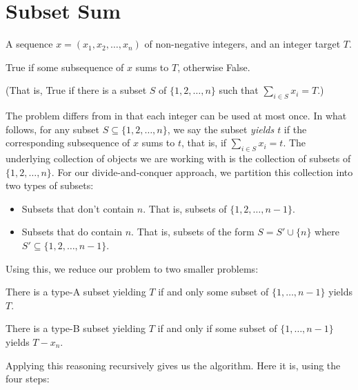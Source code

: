 
\section{Subset Sum}\label{dp: sec: subset sum}

\begin{mylist}
\item[\bf input:] A sequence $x=(x_1, x_2, \ldots, x_n)$ of non-negative integers, and an integer target $T$.
\item[\bf output:] \textsf{True} if some subsequence of $x$ sums to $T$, otherwise \textsf{False}.

  (That is, \textsf{True} if there is a subset $S$ of $\{1,2,\ldots,n\}$ such that $\sum_{i\in S} x_i = T$.)
\end{mylist}

The problem differs from  in that each integer can be used at most once.
In what follows, for any subset $S\subseteq \{1,2,\ldots, n\}$,
we say the subset \emph{yields $t$} if the corresponding subsequence of $x$ sums to $t$,
that is, if $\sum_{i\in S} x_i = t$.
%
The underlying collection of objects we are working with is the collection of subsets of $\{1,2,\ldots,n\}$.
For our divide-and-conquer approach, we partition this collection into two types of subsets:
\begin{itemize}
\item[(A)] Subsets that don't contain $n$.   That is, subsets of $\{1,2,\ldots,n-1\}$.
\item[(B)] Subsets that do contain $n$. That is, subsets of the form $S=S'\cup\{n\}$
  where $S'\subseteq \{1,2,\ldots,n-1\}$.
\end{itemize}


Using this, we reduce our problem to two smaller problems:
\begin{mylist}
\item[(i)] There is a type-A subset yielding $T$
  if and only some subset of $\{1,\ldots,n-1\}$ yields $T$.

\item[(ii)] There is a type-B subset yielding $T$
  if and only if some subset of $\{1,\ldots,n-1\}$ yields $T-x_n$.
\end{mylist}

Applying this reasoning recursively gives us the algorithm.  Here it is, using the four steps:

